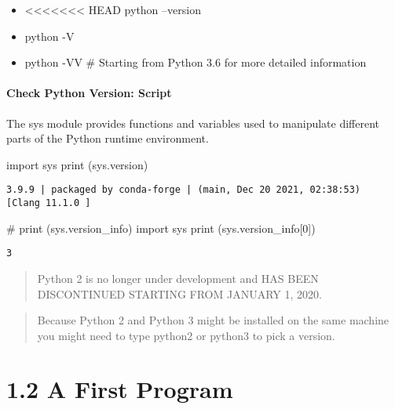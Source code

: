 \documentclass[
  letterpaper,
  DIV=11,
  numbers=noendperiod]{scrreprt}
\newenvironment{Shaded}{\begin{snugshade}}{\end{snugshade}}
\newcommand{\BuiltInTok}[1]{\textcolor[rgb]{0.00,0.46,0.62}{#1}}
\newcommand{\BuiltInTok}[1]{\textcolor[rgb]{0.00,0.48,0.65}{#1}}
\newcommand{\CommentTok}[1]{\textcolor[rgb]{0.37,0.37,0.37}{#1}}
\newcommand{\DecValTok}[1]{\textcolor[rgb]{0.68,0.00,0.00}{#1}}
\newcommand{\ImportTok}[1]{\textcolor[rgb]{0.00,0.46,0.62}{#1}}
\newcommand{\NormalTok}[1]{\textcolor[rgb]{0.00,0.46,0.62}{#1}}
\newcommand{\ImportTok}[1]{\textcolor[rgb]{0.00,0.48,0.65}{#1}}
\newcommand{\NormalTok}[1]{\textcolor[rgb]{0.00,0.48,0.65}{#1}}
\providecommand{\tightlist}{%
  \setlength{\itemsep}{0pt}\setlength{\parskip}{0pt}}
\let\oldparagraph\paragraph
\renewcommand{\paragraph}[1]{\oldparagraph{#1}\mbox{}}
\begin{document}
\begin{itemize}
\tightlist
\item
<<<<<<< HEAD
  python --version
\item
  python -V
\item
  python -VV \# Starting from Python 3.6 for more detailed information
\end{itemize}

\hypertarget{check-python-version-script}{%
\paragraph{Check Python Version:
Script}\label{check-python-version-script}}

The sys module provides functions and variables used to manipulate
different parts of the Python runtime environment.

\begin{Shaded}
\begin{Highlighting}[]
\ImportTok{import}\NormalTok{ sys}
\BuiltInTok{print}\NormalTok{ (sys.version)}
\end{Highlighting}
\end{Shaded}

\begin{verbatim}
3.9.9 | packaged by conda-forge | (main, Dec 20 2021, 02:38:53) 
[Clang 11.1.0 ]
\end{verbatim}

\begin{Shaded}
\begin{Highlighting}[]
\CommentTok{\# print (sys.version\_info)}
\ImportTok{import}\NormalTok{ sys}
\BuiltInTok{print}\NormalTok{ (sys.version\_info[}\DecValTok{0}\NormalTok{])}
\end{Highlighting}
\end{Shaded}

\begin{verbatim}
3
\end{verbatim}

\begin{quote}
Python 2 is no longer under development and HAS BEEN DISCONTINUED
STARTING FROM JANUARY 1, 2020.
\end{quote}

\begin{quote}
Because Python 2 and Python 3 might be installed on the same machine you
might need to type python2 or python3 to pick a version.
\end{quote}

\hypertarget{a-first-program}{%
\section{1.2 A First Program}\label{a-first-program}}
\end{document}
